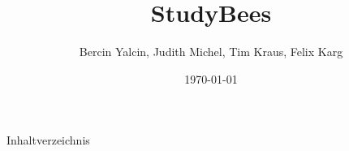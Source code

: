 \documentclass[12pt,compress,ngerman,utf8,t,usenames,dvipsnames]{beamer}
\date{\today}
\institute{University of Freiburg}
\title{StudyBees}
\author{Bercin Yalcin, Judith Michel, Tim Kraus, Felix Karg}
\begin{document}
\maketitle




\begin{frame}{Inhaltverzeichnis}
    \large
    \tableofcontents
\end{frame}



%






\end{document}
